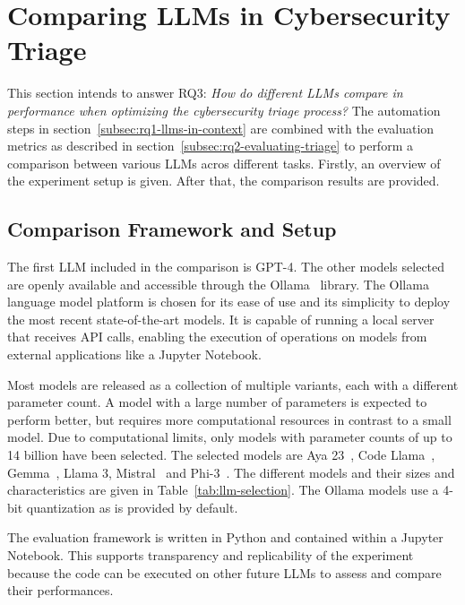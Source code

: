 \section{Comparing LLMs in Cybersecurity Triage}
\label{sec:rq3}

This section intends to answer RQ3:
\textit{How do different LLMs compare in performance when optimizing the cybersecurity triage process?}
The automation steps in section\ \ref{subsec:rq1-llms-in-context} are combined with the evaluation metrics as described
in section\ \ref{subsec:rq2-evaluating-triage} to perform a comparison between various LLMs acros different tasks.
Firstly, an overview of the experiment setup is given.
After that, the comparison results are provided.

\subsection{Comparison Framework and Setup}
\label{subsec:rq3-comparison-framework}

The first LLM included in the comparison is GPT-4.
The other models selected are openly available and accessible through the Ollama\ \citep{ollama} library.
The Ollama language model platform is chosen for its ease of use and its simplicity to deploy the most recent
state-of-the-art models.
It is capable of running a local server that receives API calls, enabling the execution of operations on models from
external applications like a Jupyter Notebook.

Most models are released as a collection of multiple variants, each with a different parameter count.
A model with a large number of parameters is expected to perform better, but requires more computational resources
in contrast to a small model.
Due to computational limits, only models with parameter counts of up to 14 billion have been selected.
The selected models are Aya 23\ \citep{aryabumi2024aya}, Code Llama\ \citep{roziere2023code},
Gemma\ \citep{team2024gemma}, Llama 3, Mistral\ \citep{jiang2023mistral} and Phi-3\ \citep{abdin2024phi}.
The different models and their sizes and characteristics are given in Table\ \ref{tab:llm-selection}.
The Ollama models use a 4-bit quantization as is provided by default.



The evaluation framework is written in Python and contained within a Jupyter Notebook.
This supports transparency and replicability of the experiment because the code can be executed on other future LLMs to
assess and compare their performances.

